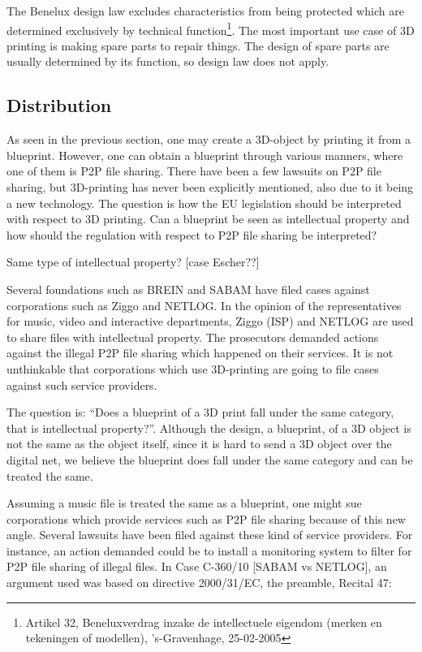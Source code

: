 The Benelux design law excludes characteristics from being protected which are determined exclusively by technical function\footnote{Artikel 32, Beneluxverdrag inzake de intellectuele eigendom (merken en tekeningen of modellen), 's-Gravenhage, 25-02-2005}.
The most important use case of 3D printing is making spare parts to repair things.
The design of spare parts are usually determined by its function, so design law does not apply.

\subsection{Distribution} %
As seen in the previous section, one may create a 3D-object by printing it from a blueprint. However, one can obtain a blueprint through various manners, where one of them is P2P file sharing. There have been a few lawsuits on P2P file sharing, but 3D-printing has never been explicitly mentioned, also due to it being a new technology. The question is how the EU legislation should be interpreted with respect to 3D printing. Can a blueprint be seen as intellectual property and how should the regulation with respect to P2P file sharing be interpreted?

Same type of intellectual property?
[case Escher??]

Several foundations such as BREIN and SABAM have filed cases against corporations such as Ziggo and NETLOG. In the opinion of the representatives for music, video and interactive departments, Ziggo (ISP) and NETLOG are used to share files with intellectual property. The prosecutors demanded actions against the illegal P2P file sharing which happened on their services. It is not unthinkable that corporations which use 3D-printing are going to file cases against such service providers.

The question is: “Does a blueprint of a 3D print fall under the same category, that is intellectual property?”. Although the design, a blueprint, of a 3D object is not the same as the object itself, since it is hard to send a 3D object over the digital net, we believe the blueprint does fall under the same category and can be treated the same.

Assuming a music file is treated the same as a blueprint, one might sue corporations which provide services such as P2P file sharing because of this new angle. Several lawsuits have been filed against these kind of service providers. For instance, an action demanded could be to install a monitoring system to filter for P2P file sharing of illegal files. In Case C-360/10 [SABAM vs NETLOG], an argument used was based on directive 2000/31/EC, the preamble, Recital 47: 

